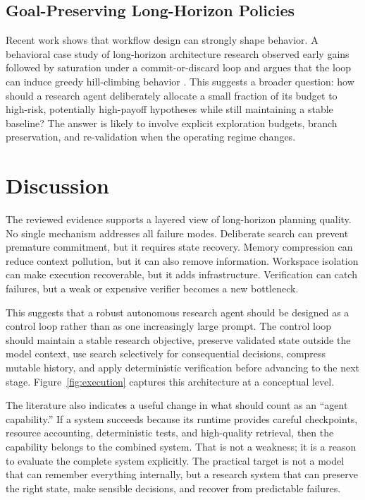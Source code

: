 \documentclass[manuscript,screen]{acmart}
\begin{document}
\subsection{Goal-Preserving Long-Horizon Policies}
Recent work shows that workflow design can strongly shape behavior. A behavioral case study of long-horizon architecture research observed early gains followed by saturation under a commit-or-discard loop and argues that the loop can induce greedy hill-climbing behavior \cite{safdar2026behaviour}. This suggests a broader question: how should a research agent deliberately allocate a small fraction of its budget to high-risk, potentially high-payoff hypotheses while still maintaining a stable baseline? The answer is likely to involve explicit exploration budgets, branch preservation, and re-validation when the operating regime changes.

\section{Discussion}\label{sec:discussion}
The reviewed evidence supports a layered view of long-horizon planning quality. No single mechanism addresses all failure modes. Deliberate search can prevent premature commitment, but it requires state recovery. Memory compression can reduce context pollution, but it can also remove information. Workspace isolation can make execution recoverable, but it adds infrastructure. Verification can catch failures, but a weak or expensive verifier becomes a new bottleneck.

This suggests that a robust autonomous research agent should be designed as a control loop rather than as one increasingly large prompt. The control loop should maintain a stable research objective, preserve validated state outside the model context, use search selectively for consequential decisions, compress mutable history, and apply deterministic verification before advancing to the next stage. Figure~\ref{fig:execution} captures this architecture at a conceptual level.

The literature also indicates a useful change in what should count as an ``agent capability.'' If a system succeeds because its runtime provides careful checkpoints, resource accounting, deterministic tests, and high-quality retrieval, then the capability belongs to the combined system. That is not a weakness; it is a reason to evaluate the complete system explicitly. The practical target is not a model that can remember everything internally, but a research system that can preserve the right state, make sensible decisions, and recover from predictable failures.
\end{document}
